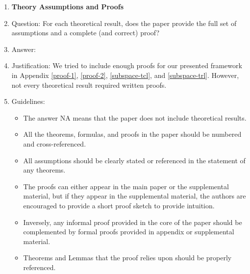 \documentclass{article}
\begin{document}
\begin{enumerate}
\item {\bf Theory Assumptions and Proofs}
    \item[] Question: For each theoretical result, does the paper provide the full set of assumptions and a complete (and correct) proof?
    \item[] Answer: \answerYes{} %
    \item[] Justification: We tried to include enough proofs for our presented framework in Appendix \ref{proof-1}, \ref{proof-2}, \ref{subspace-tcl}, and \ref{subspace-trl}. However, not every theoretical result required written proofs.
    \item[] Guidelines:
    \begin{itemize}
        \item The answer NA means that the paper does not include theoretical results. 
        \item All the theorems, formulas, and proofs in the paper should be numbered and cross-referenced.
        \item All assumptions should be clearly stated or referenced in the statement of any theorems.
        \item The proofs can either appear in the main paper or the supplemental material, but if they appear in the supplemental material, the authors are encouraged to provide a short proof sketch to provide intuition. 
        \item Inversely, any informal proof provided in the core of the paper should be complemented by formal proofs provided in appendix or supplemental material.
        \item Theorems and Lemmas that the proof relies upon should be properly referenced. 
    \end{itemize}


\end{enumerate}
\end{document}
